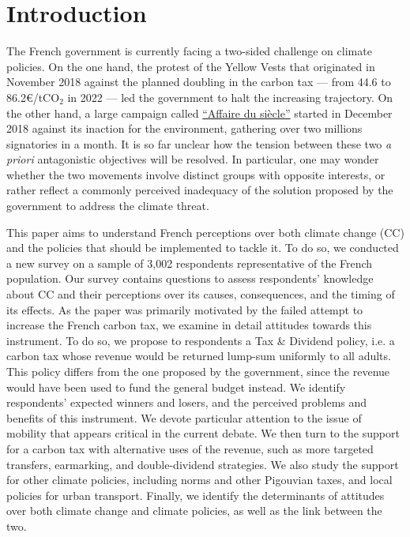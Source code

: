 \documentclass[english,5p,authoryear]{elsarticle}
\begin{document}




\setcounter{tocdepth}{2}

\vfill\eject 
\linenumbers

\section{Introduction}

The French government is currently facing a two-sided challenge on climate policies. On the one hand, the protest of the Yellow Vests that originated in November 2018 against the planned doubling in the carbon tax  --- from 44.6 to 86.2\euro{}/tCO$_2$ in 2022 --- led the government to halt the increasing trajectory. On the other hand, a large campaign called \href{https://laffairedusiecle.net/}{``Affaire du siècle''} started in December 2018 against its inaction for the environment, gathering over two millions signatories in a month. It is so far unclear how the tension between these two \textit{a priori} antagonistic objectives will be resolved. In particular, one may wonder whether the two movements involve distinct groups with opposite interests, or rather reflect a commonly perceived inadequacy of the solution proposed by the government to address the climate threat.

This paper aims to understand French perceptions over both climate change (CC) and the policies that should be implemented to tackle it. To do so, we conducted a new survey on a sample of 3,002 respondents representative of the French population. Our survey contains questions to assess respondents' knowledge about CC and their perceptions over its causes, consequences, and the timing of its effects. As the paper was primarily motivated by the failed attempt to increase the French carbon tax, we examine in detail attitudes towards this instrument. To do so, we propose to respondents a Tax \& Dividend policy, i.e. a carbon tax whose revenue would be returned lump-sum uniformly to all adults. This policy differs from the one proposed by the government, since the revenue would have been used to fund the general budget instead. We identify respondents' expected winners and losers, and the perceived problems and benefits of this instrument. We devote particular attention to the issue of mobility that appears critical in the current debate. We then turn to the support for a carbon tax with alternative uses of the revenue, such as more targeted transfers, earmarking, and double-dividend strategies. We also study the support for other climate policies, including norms and other Pigouvian taxes, and local policies for urban transport. Finally, we identify the determinants of attitudes over both climate change and climate policies, as well as the link between the two.
\end{document}
